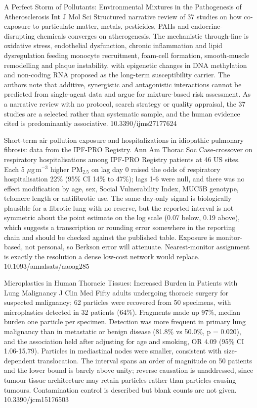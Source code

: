\documentclass[10pt]{article}
\begin{document}
{A Perfect Storm of Pollutants: Environmental Mixtures in the Pathogenesis of Atherosclerosis}
{Int J Mol Sci}
{Structured narrative review of 37 studies on how co-exposure to particulate matter, metals, pesticides, PAHs and endocrine-disrupting chemicals converges on atherogenesis. The mechanistic through-line is oxidative stress, endothelial dysfunction, chronic inflammation and lipid dysregulation feeding monocyte recruitment, foam-cell formation, smooth-muscle remodelling and plaque instability, with epigenetic changes in DNA methylation and non-coding RNA proposed as the long-term susceptibility carrier. The authors note that additive, synergistic and antagonistic interactions cannot be predicted from single-agent data and argue for mixture-based risk assessment. As a narrative review with no protocol, search strategy or quality appraisal, the 37 studies are a selected rather than systematic sample, and the human evidence cited is predominantly associative.}
{10.3390/ijms27177624}


{Short-term air pollution exposure and hospitalizations in idiopathic pulmonary fibrosis: data from the IPF-PRO Registry.}
{Ann Am Thorac Soc}
{Case-crossover on respiratory hospitalisations among IPF-PRO Registry patients at 46 US sites. Each 5 $\mu$g\,m$^{-3}$ higher PM$_{2.5}$ on lag day 0 raised the odds of respiratory hospitalisation 22\% (95\% CI 14\% to 47\%); lags 1-6 were null, and there was no effect modification by age, sex, Social Vulnerability Index, MUC5B genotype, telomere length or antifibrotic use. The same-day-only signal is biologically plausible for a fibrotic lung with no reserve, but the reported interval is not symmetric about the point estimate on the log scale (0.07 below, 0.19 above), which suggests a transcription or rounding error somewhere in the reporting chain and should be checked against the published table. Exposure is monitor-based, not personal, so Berkson error will attenuate. Nearest-monitor assignment is exactly the resolution a dense low-cost network would replace.}
{10.1093/annalsats/aaoag285}

{Microplastics in Human Thoracic Tissues: Increased Burden in Patients with Lung Malignancy}
{J Clin Med}
{Fifty adults undergoing thoracic surgery for suspected malignancy; 62 particles were recovered from 50 specimens, with microplastics detected in 32 patients (64\%). Fragments made up 97\%, median burden one particle per specimen. Detection was more frequent in primary lung malignancy than in metastatic or benign disease (81.8\% vs 50.0\%, p = 0.020), and the association held after adjusting for age and smoking, OR 4.09 (95\% CI 1.06-15.79). Particles in mediastinal nodes were smaller, consistent with size-dependent translocation. The interval spans an order of magnitude on 50 patients and the lower bound is barely above unity; reverse causation is unaddressed, since tumour tissue architecture may retain particles rather than particles causing tumours. Contamination control is described but blank counts are not given.}
{10.3390/jcm15176503}
\end{document}
